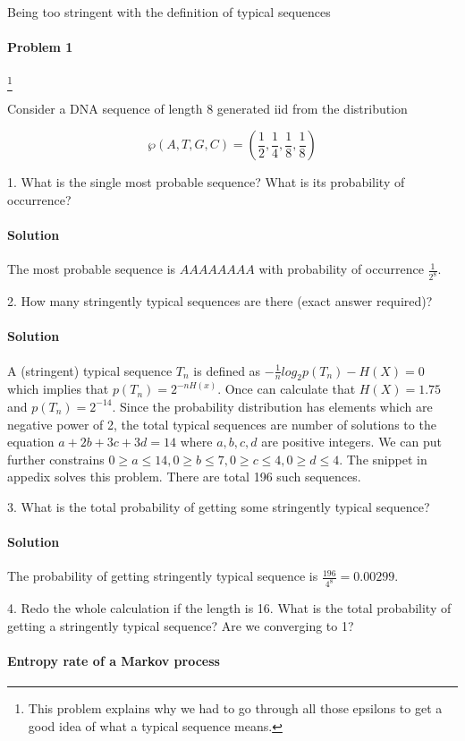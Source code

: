\documentclass{article}
\begin{document}
 
Being too stringent with the definition of typical sequences 


\paragraph{Problem 1} \footnote{This problem explains why we had to go through all those
epsilons to get a good idea of what a typical sequence means.}

Consider a DNA sequence of length 8 generated iid from the distribution 
    
$$ \wp(A, T, G, C) = (\frac{1}{2}, \frac{1}{4}, \frac{1}{8}, \frac{1}{8})$$


1. What is the single most probable sequence? What is its probability of
occurrence?

\paragraph{Solution} The most probable sequence is $AAAAAAAA$ with probability
of occurrence $\frac{1}{2^8}$.

2. How many stringently typical sequences are there (exact answer required)?  
\paragraph{Solution} A (stringent) typical sequence $T_n$ is defined as
$-\frac{1}{n} log_2 p(T_n) - H(X) = 0$ which implies that $p(T_n) = 2^{-nH(x)}$.
Once can calculate that $H(X) = 1.75$ and $p(T_n) = 2^{-14}$. Since the
probability distribution has elements which are negative power of 2, the total
typical sequences are number of solutions to the equation $a + 2b + 3c + 3d =
14$ where $a,b,c,d$ are positive integers. We can put further constrains 
$0 \ge a \le 14, 0 \ge b \le 7, 0 \ge c \le 4, 0 \ge d \le 4$. The snippet in
appedix solves this problem. There are total 196 such sequences.

3. What is the total probability of getting some stringently typical sequence?
\paragraph{Solution} The probability of getting stringently typical sequence is
$\frac{196}{4^8} = 0.00299$.

4. Redo the whole calculation if the length is 16. What is the total probability
of getting a stringently typical sequence? Are we converging to 1?  


\paragraph{Entropy rate of a Markov process}
\end{document}
